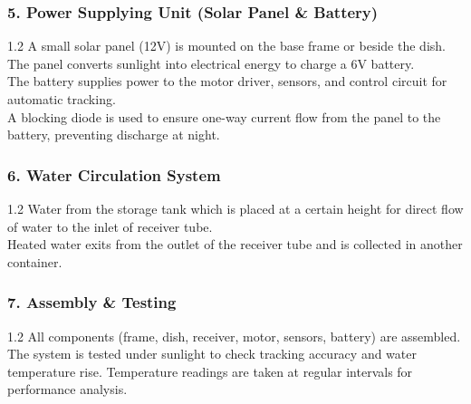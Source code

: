 \documentclass[12pt,a4paper]{article}
\begin{document}



\subsubsection*{5. Power Supplying Unit (Solar Panel \& Battery)}
\noindent
\begin{spacing}{1.2}
{\fontsize{10.2}{14.5}\selectfont
A small solar panel (12V) is mounted on the base frame or beside the dish.\\[2.5mm]
The panel converts sunlight into electrical energy to charge a 6V battery.\\[2.5mm]
The battery supplies power to the motor driver, sensors, and control circuit for automatic tracking.\\[2.5mm]
A blocking diode is used to ensure one-way current flow from the panel to the battery, preventing discharge at night.
}
\end{spacing}

\vspace{4mm}
\subsubsection*{6. Water Circulation System}
\noindent
\begin{spacing}{1.2}
{\fontsize{10.2}{14.5}\selectfont
Water from the storage tank which is placed at a certain height for direct flow of water to the inlet of receiver tube.\\[2.5mm]
Heated water exits from the outlet of the receiver tube and is collected in another container.
}
\end{spacing}

\vspace{4mm}
\subsubsection*{7. Assembly \& Testing}
\noindent
\begin{spacing}{1.2}
{\fontsize{10.2}{14.5}\selectfont
All components (frame, dish, receiver, motor, sensors, battery) are assembled.\\[2.5mm]
The system is tested under sunlight to check tracking accuracy and water temperature rise. Temperature readings are taken at regular intervals for performance analysis.
}
\end{spacing}
\end{document}
